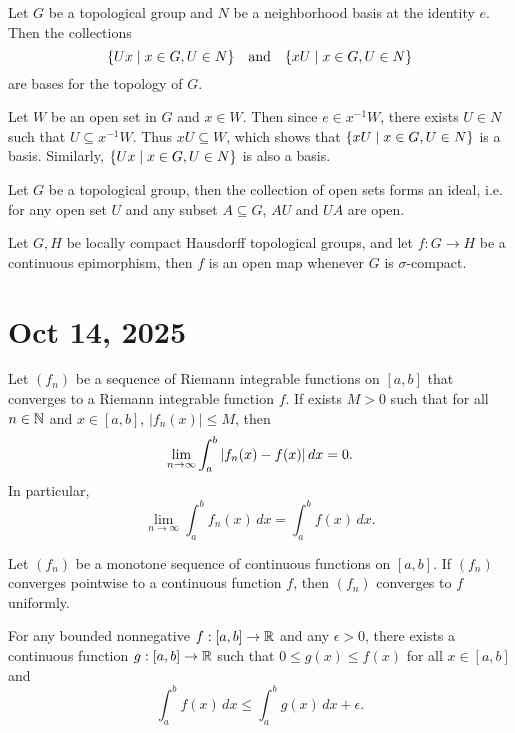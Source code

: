 \begin{prop}
    Let $G$ be a topological group and $N$ be a neighborhood basis at the identity $e$. Then the collections
    \[
    {\left\{{Ux \mid x \in G, U \in N}\right\}} \quad \text{and} \quad {\left\{{xU \mid x \in G, U \in N}\right\}}
    \]
    are bases for the topology of $G$.
    \begin{prop}
        Let $W$ be an open set in $G$ and $x \in W$. Then since $e \in x^{-1}W$, there exists $U \in N$ such that $U \subseteq x^{-1}W$. Thus $xU \subseteq W$, which shows that ${\left\{{xU \mid x \in G, U \in N}\right\}}$ is a basis. Similarly, ${\left\{{Ux \mid x \in G, U \in N}\right\}}$ is also a basis.
    \end{prop}
\end{prop}

\begin{prop}
    Let $G$ be a topological group, then the collection of open sets forms an ideal, i.e. for any open set $U$ and any subset $A \subseteq G$, $AU$ and $UA$ are open.
\end{prop}

\begin{thm}
    Let $G, H$ be locally compact Hausdorff topological groups, and let $f: G \to H$ be a continuous epimorphism, then $f$ is an open map whenever $G$ is $\sigma$-compact.
\end{thm}

\section{Oct 14, 2025}

\begin{thm}
    Let $(f_n)$ be a sequence of Riemann integrable functions on $[a, b]$ that converges to a Riemann integrable function $f$. If exists $M > 0$ such that for all $n \in {\mathbb N}$ and $x \in [a, b]$, $|f_n(x)| \leq M$, then
    \[
    \lim_{n \to \infty} \int_a^b {\left| f_n(x) - f(x) \right|} \, dx = 0.
    \]
    In particular, 
    \[
    \lim_{n \to \infty} \int_a^b f_n(x) \, dx = \int_a^b f(x) \, dx.
    \]
\end{thm}

\begin{lm}
    Let $(f_n)$ be a monotone sequence of continuous functions on $[a, b]$. If $(f_n)$ converges pointwise to a continuous function $f$, then $(f_n)$ converges to $f$ uniformly.
\end{lm}

\begin{lm}
    \label{lm:bounded-integral-approx}
    For any bounded nonnegative $f: [a, b] \to {\mathbb R}$ and any $\epsilon > 0$, there exists a continuous function $g: [a, b] \to {\mathbb R}$ such that $0 \leq g(x) \leq f(x)$ for all $x \in [a, b]$ and
    \[
    \int_a^b f(x) \, dx \leq \int_a^b g(x) \, dx + \epsilon.
    \]
\end{lm}

